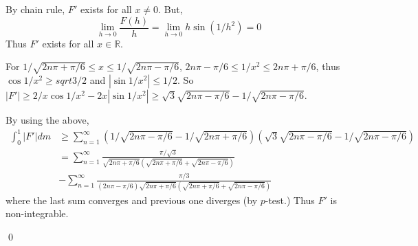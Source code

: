 \begin{problem}[3.12] \hfill

	By chain rule, $F'$ exists for all $x \ne 0$.
	But, 
	\[
		\lim_{h \rightarrow 0} \frac{F(h)}{h} = \lim_{h\rightarrow 0} h\sin (1/h^2) = 0
	\]
	Thus $F'$ exists for all $x\in \mathbb{R}$.

	For $1/\sqrt{2n\pi + \pi/6} \leq x \leq 1/\sqrt{2n\pi - \pi/6}$, $2n\pi - \pi/6 \leq 1/x^2 \leq 2n\pi + \pi/6$, thus $\cos 1/x^2 \geq sqrt{3}/2$ and $\left | \sin 1/x^2 \right | \leq 1/2$.
	So $|F'| \geq 2/x \cos 1/x^2 - 2x \left | \sin 1/x^2 \right | \geq \sqrt3 \sqrt{2n\pi -\pi/6} - 1/\sqrt{2n\pi - \pi/6}$.
	
	By using the above,
	\[
		\begin{split}
			\int_0^1 |F'| dm
			& \geq \sum_{n=1}^\infty \left( 1/\sqrt{2n\pi - \pi/6} - 1/\sqrt{2n\pi +\pi/6} \right)\left( \sqrt3 \sqrt{2n\pi - \pi/6} - 1/\sqrt{2n\pi - \pi/6} \right) \\
			& = \sum_{n=1}^\infty \frac{\pi / \sqrt 3}{\sqrt{2n\pi + \pi/6}\left( \sqrt{2n\pi + \pi/6} + \sqrt{2n\pi - \pi/6} \right)} \\
			& -\sum_{n=1}^\infty \frac{\pi/3}{\left( 2n\pi - \pi/6 \right)\sqrt{2n\pi+\pi/6} \left( \sqrt{2n\pi + \pi/6} + \sqrt{2n\pi - \pi/6} \right)}
		\end{split}
	\]
	where the last sum converges and previous one diverges (by $p$-test.)
	Thus $F'$ is non-integrable.

	\qed
\end{problem}

